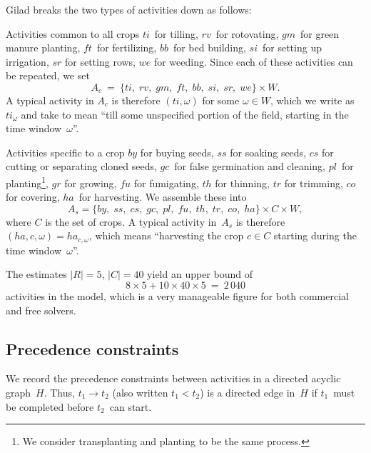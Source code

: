 \documentclass[11pt,reqno]{amsart}
\newcommand{\lra}{\longrightarrow}
\numberwithin{equation}{section}
\begin{document}
\smallskip
Gilad breaks the two types of activities down as follows:

\begin{mydesc}
\item[Activities common to all crops] $ti$~for tilling, $rv$~for rotovating, $gm$~for
  green manure planting, $f\!t$~for fertilizing, $bb$~for bed building, $si$~for setting
  up irrigation, $sr$ for setting rows, $we$ for weeding. Since each of these activities
  can be repeated, we set
  \[
     A_c 
     \ = \
     \{ ti,\;rv,\;gm,\;f\!t,\;bb,\;si,\;sr,\;we\} \times W.
  \]
  A typical activity in $A_c$ is therefore $(ti,\omega)$ for some $\omega\in W$, which we
  write as $ti_{\omega}$ and take to mean ``till some unspecified portion of the field,
  starting in the time window~$\omega$''.


\item[Activities specific to a crop] $by$ for buying seeds, $ss$ for soaking seeds, $cs$
  for cutting or separating cloned seeds, $gc$~for false germination and cleaning,
  $pl$~for planting\footnote{We consider transplanting and planting to be the same
    process.}, $gr$ for growing, $f\!u$ for fumigating, $th$ for thinning, $tr$ for
  trimming, $co$ for covering, $ha$~for harvesting. We assemble these into
  \[
     A_s = \{ by,\;ss,\;cs,\;gc,\;pl,\;f\!u,\;th,\;tr,\;co,\;ha\}
     \times C \times W,
  \]
  where $C$ is the set of crops. A typical activity in~$A_s$ is therefore $(ha,c,
  \omega)=ha_{c, \omega}$, which means ``harvesting the crop $c\in C$ starting during the
  time window~$\omega$''.
\end{mydesc}

The estimates $|R|=5$, $|C|=40$ yield an upper bound of
\[
    8  \times 5 + 10 \times 40  \times 5
    \ = \
    2\,040
\]
activities in the model, which is a very manageable figure for both commercial and free
solvers.


\subsection{Precedence constraints}

We record the precedence constraints between  activities in a directed acyclic
graph~$H$. Thus, $t_1\lra t_2$ (also written $t_1<t_2$) is a directed edge
in~$H$ if $t_1$~must be completed before $t_2$~can start. 
\end{document}
